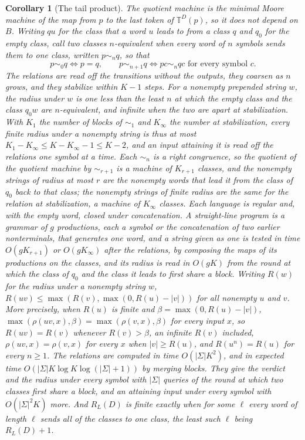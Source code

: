 \documentclass[11pt,a4paper]{article}
\theoremstyle{definition}
\theoremstyle{plain}
\newtheorem{corollary}{Corollary}
\newcommand{\T}{\mathbb{T}}
\newcommand{\ripple}{R_{L}}
\begin{document}
\begin{corollary}[The tail product]
The quotient machine is the minimal Moore machine of the map from \(p\) to the last token of \(\T^D(p)\), so it does not
depend on \(B\). Writing \(qu\) for the class that a word \(u\) leads to from a class \(q\) and \(q_0\) for the empty
class, call two classes \(n\)-equivalent when every word of \(n\) symbols sends them to one class, written
\(p \sim_n q\), so that
\[
p \sim_0 q \iff p = q, \qquad p \sim_{n+1} q \iff pc \sim_n qc \text{ for every symbol } c.
\]
The relations are read off the transitions without the outputs, they coarsen as \(n\) grows, and they stabilize within
\(K - 1\) steps. For a nonempty prepended string \(w\), the radius under \(w\) is one less than the least \(n\) at which
the empty class and the class \(q_0 w\) are \(n\)-equivalent, and infinite when the two are apart at stabilization. With
\(K_1\) the number of blocks of \(\sim_1\) and \(K_\infty\) the number at stabilization, every finite radius under a
nonempty string is thus at most \(K_1 - K_\infty \le K - K_\infty - 1 \le K - 2\), and an input attaining it is read off
the relations one symbol at a time. Each \(\sim_n\) is a right congruence, so the quotient of the quotient machine by
\(\sim_{r+1}\) is a machine of \(K_{r+1}\) classes, and the nonempty strings of radius at most \(r\) are the nonempty
words that lead it from the class of \(q_0\) back to that class; the nonempty strings of finite radius are the same for
the relation at stabilization, a machine of \(K_\infty\) classes. Each language is regular and, with the empty word,
closed under concatenation. A straight-line program is a grammar of \(g\) productions, each a symbol or the
concatenation of two earlier nonterminals, that generates one word, and a string given as one is tested in time
\(O(gK_{r+1})\) or \(O(gK_\infty)\) after the relations, by composing the maps of its productions on the classes, and
its radius is read in \(O(gK)\) from the round at which the class of \(q_0\) and the class it leads to first share a
block. Writing \(R(w)\) for the radius under a nonempty string \(w\), \(R(uv) \le \max(R(v), \max(0, R(u) - |v|))\) for
all nonempty \(u\) and \(v\). More precisely, when \(R(u)\) is finite and \(\beta = \max(0, R(u) - |v|)\),
\(\max(\rho(uv, x), \beta) = \max(\rho(v, x), \beta)\) for every input \(x\), so \(R(uv) = R(v)\) whenever
\(R(v) > \beta\), an infinite \(R(v)\) included, \(\rho(uv, x) = \rho(v, x)\) for every \(x\) when \(|v| \ge R(u)\), and
\(R(u^n) = R(u)\) for every \(n \ge 1\). The relations are computed in time \(O(|\Sigma| K^2)\), and in expected time
\(O(|\Sigma| K \log K \log(|\Sigma| + 1))\) by merging blocks. They give the verdict and the radius under every symbol
with \(|\Sigma|\) queries of the round at which two classes first share a block, and an attaining input under every
symbol with \(O(|\Sigma|^2 K)\) more. And \(\ripple(D)\) is finite exactly when for some \(\ell\) every word of length
\(\ell\) sends all of the classes to one class, the least such \(\ell\) being \(\ripple(D) + 1\).
\end{corollary}
\end{document}
